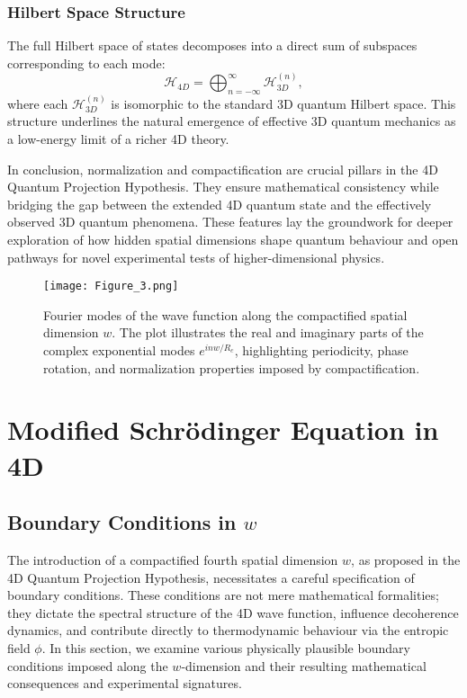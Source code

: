 \documentclass[12pt]{article}
\begin{document}
\subsubsection*{Hilbert Space Structure}

The full Hilbert space of states decomposes into a direct sum of subspaces corresponding to each mode:
\begin{equation}
    \mathcal{H}_{4D} = \bigoplus_{n=-\infty}^\infty \mathcal{H}_{3D}^{(n)},
\end{equation}
where each \(\mathcal{H}_{3D}^{(n)}\) is isomorphic to the standard 3D quantum Hilbert space. This structure underlines the natural emergence of effective 3D quantum mechanics as a low-energy limit of a richer 4D theory.

\medskip

In conclusion, normalization and compactification are crucial pillars in the 4D Quantum Projection Hypothesis. They ensure mathematical consistency while bridging the gap between the extended 4D quantum state and the effectively observed 3D quantum phenomena. These features lay the groundwork for deeper exploration of how hidden spatial dimensions shape quantum behaviour and open pathways for novel experimental tests of higher-dimensional physics.

\begin{figure}[htbp]
    \centering
    \texttt{[image: Figure\_3.png]}
    \caption{Fourier modes of the wave function along the compactified spatial dimension \(w\). The plot illustrates the real and imaginary parts of the complex exponential modes \(e^{i n w / R_c}\), highlighting periodicity, phase rotation, and normalization properties imposed by compactification.}
    \label{fig:figure3}
\end{figure}


\section{Modified Schrödinger Equation in 4D}

\subsection{Boundary Conditions in \(w\)}
\label{subsec:boundary_conditions_w}

The introduction of a compactified fourth spatial dimension \(w\), as proposed in the 4D Quantum Projection Hypothesis, necessitates a careful specification of boundary conditions. These conditions are not mere mathematical formalities; they dictate the spectral structure of the 4D wave function, influence decoherence dynamics, and contribute directly to thermodynamic behaviour via the entropic field \(\phi\). In this section, we examine various physically plausible boundary conditions imposed along the \(w\)-dimension and their resulting mathematical consequences and experimental signatures.
\end{document}
